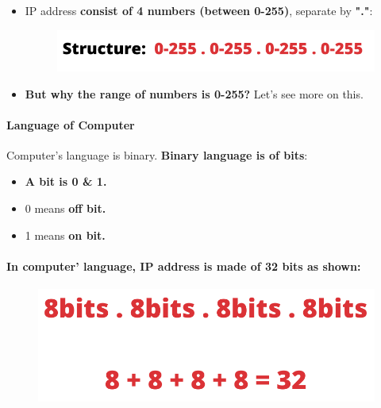 \setlength{\columnsep}{3pt}
\begin{flushleft}

\begin{itemize}
	\item IP address \textbf{consist of 4 numbers (between 0-255)}, separate by \textbf{"."}:
	\begin{figure}[h!]
		\centering
		\includegraphics[scale=0.6]{content/chapter14/images/struct1.png}
	\end{figure}
	\item \textbf{But why the range of numbers is 0-255?} \newline Let's see more on this.

\end{itemize}	


\bigskip
\bigskip
\paragraph{Language of Computer}
Computer's language is binary. \textbf{Binary language is of bits}:
\begin{itemize}
	\item \textbf{A bit is 0 & 1.}
	\item 0 means \textbf{off bit.}
	\item 1 means \textbf{on bit.}
\end{itemize}

\bigskip
\bigskip

\paragraph{In computer' language, IP address is made of 32 bits as shown: }
	\begin{figure}[h!]
	\centering
	\includegraphics[scale=0.4]{content/chapter14/images/bits_2.png}
\end{figure}


\end{flushleft}
